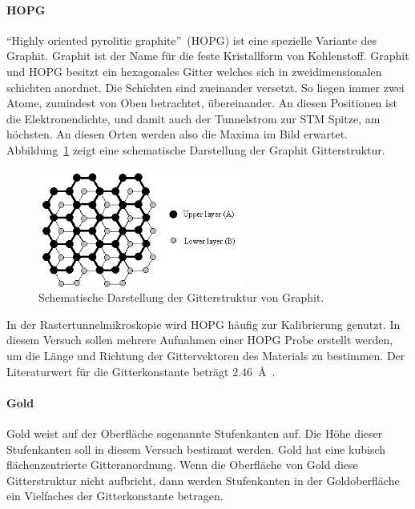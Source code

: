 \paragraph{HOPG}
\enquote{Highly oriented pyrolitic graphite}~(HOPG) ist eine spezielle Variante des Graphit.
Graphit ist der Name für die feste  Kristallform von Kohlenstoff. Graphit und HOPG besitzt ein hexagonales Gitter  welches sich in zweidimensionalen
schichten anordnet. Die Schichten sind zueinander versetzt. So liegen immer zwei Atome, zumindest von Oben betrachtet,  übereinander. An diesen
Positionen ist die Elektronendichte, und damit auch der Tunnelstrom zur STM Spitze, am höchsten. An diesen Orten werden also die Maxima im Bild erwartet.
Abbildung~\ref{fig:hopg_structure} zeigt eine schematische Darstellung der Graphit Gitterstruktur.
\begin{figure}
  \centering
  \includegraphics[width=0.6\textwidth]{images/hopg_structure.png}
  \caption{Schematische Darstellung der Gitterstruktur von Graphit.\cite{hopg_structure}}
  \label{fig:hopg_structure}
\end{figure}
In der Rastertunnelmikroskopie wird HOPG häufig zur Kalibrierung genutzt.
In diesem Versuch sollen mehrere Aufnahmen einer HOPG Probe erstellt werden,
um die Länge und Richtung der Gittervektoren des Materials zu bestimmen.
Der Literaturwert für die Gitterkonstante beträgt \SI{2.46}{\angstrom}~\cite{stm1}.

\paragraph{Gold}
Gold weist auf der Oberfläche sogenannte Stufenkanten auf. Die Höhe dieser Stufenkanten soll in diesem Versuch bestimmt werden.
Gold hat eine kubisch flächenzentrierte Gitteranordnung. Wenn die Oberfläche von Gold diese Gitterstruktur nicht aufbricht, dann werden Stufenkanten
in der Goldoberfläche ein Vielfaches der Gitterkonstante betragen.
